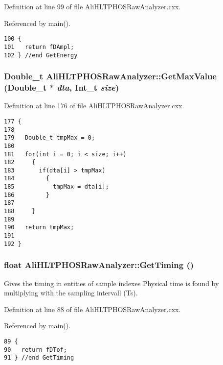 Definition at line 99 of file Ali\-HLTPHOSRaw\-Analyzer.cxx.

Referenced by main().

\footnotesize\begin{verbatim}100 {
101   return fDAmpl;
102 } //end GetEnergy
\end{verbatim}\normalsize 


\subsubsection{\setlength{\rightskip}{0pt plus 5cm}Double\_\-t Ali\-HLTPHOSRaw\-Analyzer::Get\-Max\-Value (Double\_\-t $\ast$ {\em dta}, Int\_\-t {\em size})\hspace{0.3cm}{\tt  [inherited]}}\label{classAliHLTPHOSRawAnalyzer_AliHLTPHOSRawAnalyzerPeakFindera18}




Definition at line 176 of file Ali\-HLTPHOSRaw\-Analyzer.cxx.

\footnotesize\begin{verbatim}177 {
178 
179   Double_t tmpMax = 0;
180 
181   for(int i = 0; i < size; i++)
182     {
183       if(dta[i] > tmpMax)
184         {
185           tmpMax = dta[i];
186         }
187 
188     }
189   
190   return tmpMax;
191 
192 }
\end{verbatim}\normalsize 


\subsubsection{\setlength{\rightskip}{0pt plus 5cm}float Ali\-HLTPHOSRaw\-Analyzer::Get\-Timing ()\hspace{0.3cm}{\tt  [inherited]}}\label{classAliHLTPHOSRawAnalyzer_AliHLTPHOSRawAnalyzerPeakFindera10}


Gives the timing in entities of sample indexes Physical time is found by multiplying with the sampling intervall (Ts). 

Definition at line 88 of file Ali\-HLTPHOSRaw\-Analyzer.cxx.

Referenced by main().

\footnotesize\begin{verbatim}89 {
90   return fDTof;
91 } //end GetTiming
\end{verbatim}\normalsize 


